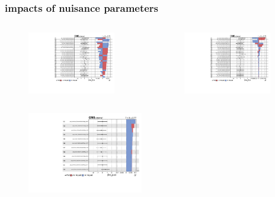 \documentclass{beamer}
\begin{document}


\begin{frame}[label=impacts2]
\frametitle{impacts of nuisance parameters}
\vspace{-10pt}
\begin{columns}
	\begin{figure}
		\includegraphics[width=0.9\textwidth]{impacts5.pdf}
	\end{figure}
	\begin{figure}
		\includegraphics[width=0.9\textwidth]{impacts6.pdf}
	\end{figure}
\end{columns}
\vspace{-10pt}
\begin{figure}
	\includegraphics[width=0.45\textwidth]{impacts7.pdf}
\end{figure}\end{frame}
\end{document}

